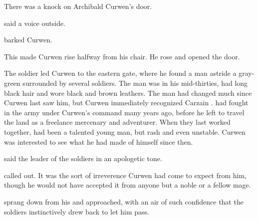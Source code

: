 








\begin{comment}
  \subsection{Carzain meets Curwen}
\end{comment}
There was a knock on Archibald Curwen's door. 

 said a voice outside. 

 barked Curwen. 


This made Curwen rise halfway from his chair.
He rose and opened the door. 


The soldier led Curwen to the eastern gate, where he found a man astride a gray-green \relc surrounded by several soldiers. 
The man was in his mid-thirties, had long black hair and wore black and brown \travelling leathers. 
The man had changed much since Curwen last saw him, but Curwen immediately recognized Carzain \Shachar. 
\Shachar had fought in the army under Curwen's command many years ago, before he left to travel the land as a freelance mercenary and adventurer. 
When they last worked together, \Shachar had been a talented young man, but rash and even unstable. 
Curwen was interested to see what he had made of himself since then. 

 said the leader of the soldiers in an apologetic tone.

 \Shachar called out. 
It was the sort of irreverence Curwen had come to expect from him, though he would not have accepted it from anyone but a noble or a fellow mage. 

\Shachar sprang down from his \relc and approached, with an air of such confidence that the soldiers instinctively drew back to let him pass. 

